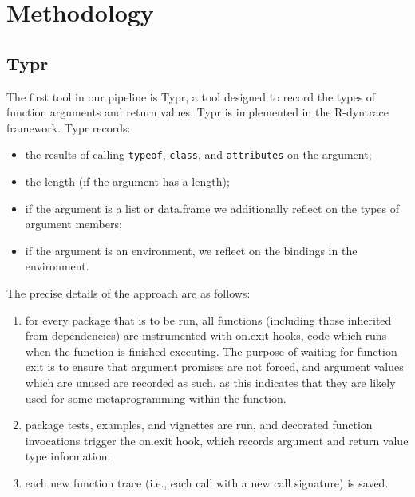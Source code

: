 \documentclass[sigplan,10pt,review,anonymous]{acmart}\settopmatter{printfolios=true,printccs=false,printacmref=false}
\begin{document}
%
%
%
%
%
%
\section{Methodology}
\label{sec:methodology}




%
%
%
%
\subsection{Typr}


The first tool in our pipeline is Typr, a tool designed to record the types of function arguments and return values.
Typr is implemented in the R-dyntrace framework.
Typr records:

\begin{itemize}
\item the results of calling {\tt typeof}, {\tt class}, and {\tt attributes} on the argument;
\item the length (if the argument has a length);
\item if the argument is a list or data.frame we additionally reflect on the types of argument members;
\item if the argument is an environment, we reflect on the bindings in the environment.
\end{itemize}

The precise details of the approach are as follows:

\begin{enumerate}
\item for every package that is to be run, all functions (including those inherited from dependencies) are instrumented with on.exit hooks, code which runs when the function is finished executing.
The purpose of waiting for function exit is to ensure that argument promises are not forced, and argument values which are unused are recorded as such, as this indicates that they are likely used for some metaprogramming within the function.
\item package tests, examples, and vignettes are run, and decorated function invocations trigger the on.exit hook, which records argument and return value type information.
\item each new function trace (i.e., each call with a new call signature) is saved.
\end{enumerate}
\end{document}
